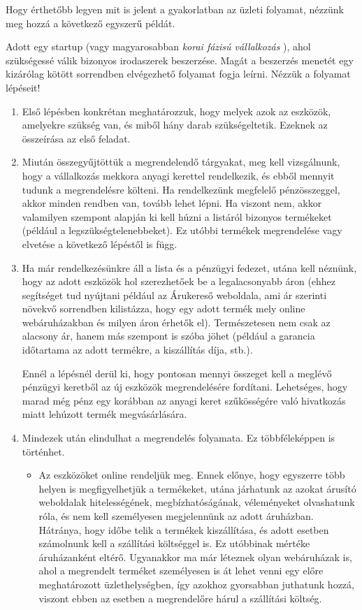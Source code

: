 Hogy érthetőbb legyen mit is jelent a gyakorlatban az üzleti folyamat, nézzünk meg hozzá a következő egyszerű példát.

Adott egy startup (vagy magyarosabban \textit{korai fázisú vállalkozás} \cite{wiki}), ahol szükségessé válik bizonyos irodaszerek beszerzése. Magát a beszerzés menetét egy kizárólag kötött sorrendben elvégezhető folyamat fogja leírni. Nézzük a folyamat lépéseit!

\begin{enumerate}
\item Első lépésben konkrétan meghatározzuk, hogy melyek azok az eszközök, amelyekre szükség van, és miből hány darab szükségeltetik. Ezeknek az összeírása az első feladat.

\item Miután összegyűjtöttük a megrendelendő tárgyakat, meg kell vizsgálnunk, hogy a vállalkozás mekkora anyagi kerettel rendelkezik, és ebből mennyit tudunk a megrendelésre költeni. Ha rendelkezünk megfelelő pénzösszeggel, akkor minden rendben van, tovább lehet lépni. Ha viszont nem, akkor valamilyen szempont alapján ki kell húzni a listáról bizonyos termékeket (például a legszükségtelenebbeket). Ez utóbbi termékek megrendelése vagy elvetése a következő lépéstől is függ.

\item Ha már rendelkezésünkre áll a lista és a pénzügyi fedezet, utána kell néznünk, hogy az adott eszközök hol szerezhetőek be a legalacsonyabb áron (ehhez segítséget tud nyújtani például az Árukereső \cite{arukereso} weboldala, ami ár szerinti növekvő sorrendben kilistázza, hogy egy adott termék mely online webáruházakban és milyen áron érhetők el). Természetesen nem csak az alacsony ár, hanem más szempont is szóba jöhet (például a garancia időtartama az adott termékre, a kiszállítás díja, stb.).

Ennél a lépésnél derül ki, hogy pontosan mennyi összeget kell a meglévő pénzügyi keretből az új eszközök megrendelésére fordítani. Lehetséges, hogy marad még pénz egy korábban az anyagi keret szűkösségére való hivatkozás miatt lehúzott termék megvásárlására.

\item Mindezek után elindulhat a megrendelés folyamata. Ez többféleképpen is történhet.

\begin{itemize}
\item Az eszközöket online rendeljük meg. Ennek előnye, hogy egyszerre több helyen is megfigyelhetjük a termékeket, utána járhatunk az azokat árusító weboldalak hitelességének, megbízhatóságának, véleményeket olvashatunk róla, és nem kell személyesen megjelennünk az adott áruházban. Hátránya, hogy időbe telik a termékek kiszállítása, és adott esetben számolnunk kell a szállítási költséggel is. Ez utóbbinak mértéke áruházanként eltérő. Ugyanakkor ma már léteznek olyan webáruházak is, ahol a megrendelt terméket személyesen is át lehet venni egy előre meghatározott üzlethelységben, így azokhoz gyorsabban juthatunk hozzá, viszont ebben az esetben a megrendelőre hárul a szállítási költség.


\end{itemize}
\end{enumerate}
